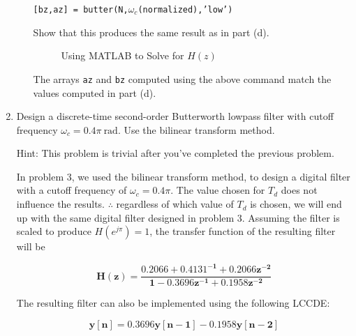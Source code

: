 \documentclass[fleqn]{article}
\begin{document}
\begin{enumerate}[nolistsep]
\begin{enumerate}
			\texttt{[bz,az] = butter(N,$\omega_c$(normalized),'low')}
			
			Show that this produces the same result as in part (d).
			
			\begin{figure}[H]
					\centerline{}
					\caption{Using MATLAB to Solve for $H(z)$}
			\end{figure}
				
			The arrays \texttt{az} and \texttt{bz} computed using the above command match the values computed in part (d).
		\end{enumerate}
		
		\item Design a discrete-time second-order Butterworth lowpass filter with cutoff frequency $\omega_c = 0.4\pi\ \text{rad}$. Use the bilinear transform method.
		
		Hint: This problem is trivial after you've completed the previous problem.
		
		In problem 3, we used the bilinear transform method, to design a digital filter with a cutoff frequency of $\omega_c = 0.4\pi$. The value chosen for $T_d$ does not influence the results. $\therefore$ regardless of which value of $T_d$ is chosen, we will end up with the same digital filter designed in problem 3. Assuming the filter is scaled to produce \newline $H(e^{j\pi}) = 1$, the transfer function of the resulting filter will be
		
		\begin{equation*}
			\mathbf{H(z) = \frac{0.2066 + 0.4131^{-1} + 0.2066z^{-2}}{1 - 0.3696z^{-1} + 0.1958z^{-2}}}
		\end{equation*}
		
		The resulting filter can also be implemented using the following LCCDE:
		
		\begin{equation*}
			\mathbf{y[n] = 0.3696y[n-1] - 0.1958y[n-2]}
		\end{equation*}
			

\end{enumerate}
\end{document}
